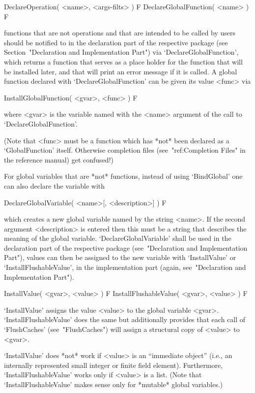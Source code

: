 \>DeclareOperation( <name>, <args-filts> ) F
\>DeclareGlobalFunction( <name> ) F

{\GAP} functions that are not operations and that are intended to be
called by users should be notified to {\GAP} in the declaration part
of the respective package
(see Section~"Declaration and Implementation Part")
via `DeclareGlobalFunction', which returns a function that serves as a
place holder for the function that will be installed later,
and that will print an error message if it is called.
A global function declared with `DeclareGlobalFunction' can be given its
value <func> via

\>InstallGlobalFunction( <gvar>, <func> ) F

where <gvar> is the variable named with the <name> argument of the call
to `DeclareGlobalFunction'.

(Note that <func> must be a function which has *not* been declared as a
`GlobalFunction' itself. Otherwise completion files
(see~"ref:Completion Files" in the reference manual) get confused!)

For global variables that are *not* functions,
instead of using `BindGlobal' one can also declare the variable with

\>DeclareGlobalVariable( <name>[, <description>] ) F

which creates a new global variable named by the string <name>.
If the second argument <description> is entered then this must be
a string that describes the meaning of the global variable.
`DeclareGlobalVariable' shall be used in the declaration part of the
respective package (see~"Declaration and Implementation Part"),
values can then be assigned to the new variable with `InstallValue' or
`InstallFlushableValue', in the implementation part
(again, see~"Declaration and Implementation Part").

\>InstallValue( <gvar>, <value> ) F
\>InstallFlushableValue( <gvar>, <value> ) F

`InstallValue' assigns the value <value> to the global variable <gvar>.
`InstallFlushableValue' does the same but additionally provides that
each call of `FlushCaches' (see~"FlushCaches")
will assign a structural copy of <value> to <gvar>.

`InstallValue' does *not* work if <value> is an ``immediate object''
(i.e., an internally represented small integer or finite field element).
Furthermore, `InstallFlushableValue' works only if <value> is a list.
(Note that `InstallFlushableValue' makes sense only for *mutable*
global variables.)

